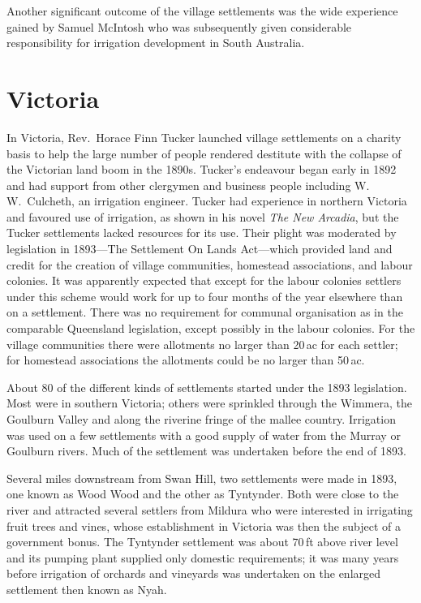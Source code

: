 Another significant outcome of the village settlements was the wide
experience gained by Samuel McIntosh who was subsequently given
considerable responsibility for irrigation development in South
Australia.

\section*{Victoria}

In Victoria, Rev.~Horace Finn Tucker launched village settlements on a
charity basis to help the large number of people rendered destitute
with the collapse of the Victorian land boom in the 1890s.  Tucker's
endeavour began early in 1892 and had support from other clergymen and
business people including W.\,W.~Culcheth, an irrigation
engineer.  Tucker had experience in northern Victoria and
favoured use of irrigation, as shown in his novel \textsl{The New
Arcadia}, but the Tucker settlements lacked resources for its
use.  Their plight
was moderated by legislation in 1893---The Settlement On Lands
Act---which provided land and credit for the creation of village
communities, homestead associations, and labour colonies.  It was
apparently expected that except for the labour colonies settlers under
this scheme would work for up to four months of the year elsewhere
than on a settlement.  There was no requirement for communal
organisation as in the comparable Queensland legislation, except
possibly in the labour colonies.  For the village communities there
were allotments no larger than 20\,ac for each settler; for homestead
associations the allotments could be no larger than 50\,ac.

About 80 of the different kinds of settlements started under the 1893
legislation.  Most were in southern Victoria; others were sprinkled
through the Wimmera, the Goulburn Valley and along the riverine fringe
of the mallee country.  Irrigation was used on a few settlements with
a good supply of water from the Murray or Goulburn rivers.  Much of
the settlement was undertaken before the end of 1893.

Several miles downstream from Swan Hill, two settlements were made in
1893, one known as Wood Wood and the other as Tyntynder.  Both were close to the river and attracted several
settlers from Mildura who were interested in irrigating fruit trees
and vines, whose establishment in Victoria was then the subject of a
government bonus.  The
Tyntynder settlement was about 70\,ft above river level and its
pumping plant supplied only domestic requirements; it was many years
before irrigation of orchards and vineyards was undertaken on the
enlarged settlement then known as Nyah.

